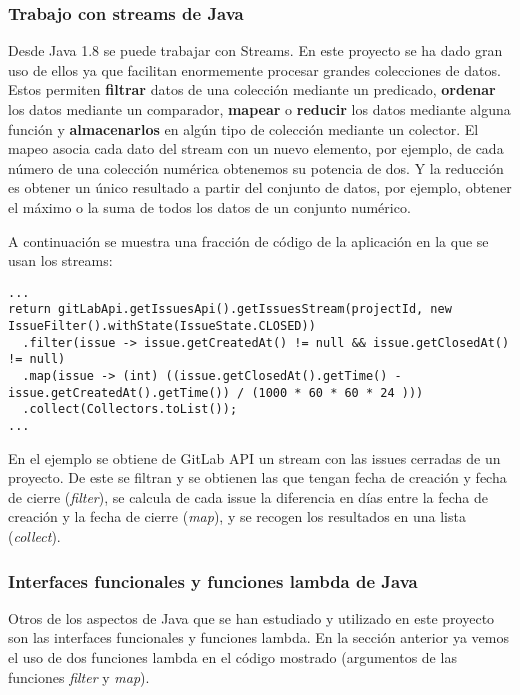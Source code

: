 \subsubsection{Trabajo con streams de Java}

Desde Java 1.8 se puede trabajar con Streams. En este proyecto se ha dado gran uso de ellos ya que facilitan enormemente procesar grandes colecciones de datos. Estos permiten \textbf{filtrar} datos de una colección mediante un predicado, \textbf{ordenar} los datos mediante un comparador, \textbf{mapear} o \textbf{reducir} los datos mediante alguna función y \textbf{almacenarlos} en algún tipo de colección mediante un colector. El mapeo asocia cada dato del stream con un nuevo elemento, por ejemplo, de cada número de una colección numérica obtenemos su potencia de dos. Y la reducción es obtener un único resultado a partir del conjunto de datos, por ejemplo, obtener el máximo o la suma de todos los datos de un conjunto numérico.

A continuación se muestra una fracción de código de la aplicación en la que se usan los streams:\\
\begin{minipage}{\linewidth}
{\tiny
\begin{lstlisting}[breaklines]
...
return gitLabApi.getIssuesApi().getIssuesStream(projectId, new IssueFilter().withState(IssueState.CLOSED))
  .filter(issue -> issue.getCreatedAt() != null && issue.getClosedAt() != null)
  .map(issue -> (int) ((issue.getClosedAt().getTime() - issue.getCreatedAt().getTime()) / (1000 * 60 * 60 * 24 )))
  .collect(Collectors.toList());
...
\end{lstlisting}
}
\end{minipage}

En el ejemplo se obtiene de GitLab API un stream con las issues cerradas de un proyecto. De este se filtran y se obtienen las que tengan fecha de creación y fecha de cierre (\textit{filter}), se calcula de cada issue la diferencia en días entre la fecha de creación y la fecha de cierre (\textit{map}), y se recogen los resultados en una lista (\textit{collect}).

\subsubsection{Interfaces funcionales y funciones lambda de Java}

Otros de los aspectos de Java que se han estudiado y utilizado en este proyecto son las interfaces funcionales y funciones lambda. En la sección anterior ya vemos el uso de dos funciones lambda en el código mostrado (argumentos de las funciones \textit{filter} y \textit{map}).

